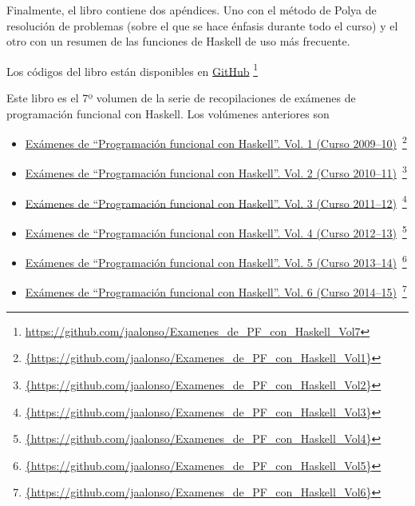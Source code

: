 \documentclass[a4paper,12pt,twoside]{book}
\begin{document}
Finalmente, el libro contiene dos apéndices. Uno con el método de Polya
de resolución de problemas (sobre el que se hace énfasis durante todo el
curso) y el otro con un resumen de las funciones de Haskell de uso más
frecuente.

Los códigos del libro están disponibles en
\href{https://github.com/jaalonso/Examenes_de_PF_con_Haskell_Vol7}
     {GitHub}
     \footnote{{\url{https://github.com/jaalonso/Examenes_de_PF_con_Haskell_Vol7}}}

Este libro es el 7º volumen de la serie de recopilaciones de
exámenes de programación funcional con Haskell. Los volúmenes anteriores son
\begin{itemize}
\item
  \href{https://github.com/jaalonso/Examenes_de_PF_con_Haskell_Vol1}
  {Exámenes de ``Programaci\'on funcional con Haskell''.
    Vol. 1 (Curso 2009--10)}\
    \footnote{\url{{https://github.com/jaalonso/Examenes_de_PF_con_Haskell_Vol1}}}

\item
  \href{https://github.com/jaalonso/Examenes_de_PF_con_Haskell_Vol2}
  {Exámenes de ``Programaci\'on funcional con Haskell''.
    Vol. 2 (Curso 2010--11)}\
    \footnote{\url{{https://github.com/jaalonso/Examenes_de_PF_con_Haskell_Vol2}}}

\item
  \href{https://github.com/jaalonso/Examenes_de_PF_con_Haskell_Vol3}
  {Exámenes de ``Programaci\'on funcional con Haskell''.
    Vol. 3 (Curso 2011--12)}\
    \footnote{\url{{https://github.com/jaalonso/Examenes_de_PF_con_Haskell_Vol3}}}

\item
  \href{https://github.com/jaalonso/Examenes_de_PF_con_Haskell_Vol4}
  {Exámenes de ``Programaci\'on funcional con Haskell''.
    Vol. 4 (Curso 2012--13)}\
    \footnote{\url{{https://github.com/jaalonso/Examenes_de_PF_con_Haskell_Vol4}}}

\item
  \href{https://github.com/jaalonso/Examenes_de_PF_con_Haskell_Vol5}
  {Exámenes de ``Programaci\'on funcional con Haskell''.
    Vol. 5 (Curso 2013--14)}\
    \footnote{\url{{https://github.com/jaalonso/Examenes_de_PF_con_Haskell_Vol5}}}

\item
  \href{https://github.com/jaalonso/Examenes_de_PF_con_Haskell_Vol6}
  {Exámenes de ``Programaci\'on funcional con Haskell''.
    Vol. 6 (Curso 2014--15)}\
    \footnote{\url{{https://github.com/jaalonso/Examenes_de_PF_con_Haskell_Vol6}}}

\end{itemize}
     
\end{document}
